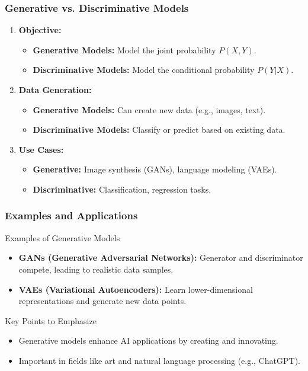 \documentclass[aspectratio=169]{beamer}
\begin{document}
\begin{frame}[fragile]
    \frametitle{Generative vs. Discriminative Models}
    \begin{enumerate}
        \item \textbf{Objective:}
        \begin{itemize}
            \item \textbf{Generative Models:} Model the joint probability \(P(X, Y)\).
            \item \textbf{Discriminative Models:} Model the conditional probability \(P(Y|X)\).
        \end{itemize}
        
        \item \textbf{Data Generation:}
        \begin{itemize}
            \item \textbf{Generative Models:} Can create new data (e.g., images, text).
            \item \textbf{Discriminative Models:} Classify or predict based on existing data.
        \end{itemize}
        
        \item \textbf{Use Cases:}
        \begin{itemize}
            \item \textbf{Generative:} Image synthesis (GANs), language modeling (VAEs).
            \item \textbf{Discriminative:} Classification, regression tasks.
        \end{itemize}
    \end{enumerate}
\end{frame}

\begin{frame}[fragile]
    \frametitle{Examples and Applications}
    \begin{block}{Examples of Generative Models}
        \begin{itemize}
            \item \textbf{GANs (Generative Adversarial Networks):} Generator and discriminator compete, leading to realistic data samples.
            \item \textbf{VAEs (Variational Autoencoders):} Learn lower-dimensional representations and generate new data points.
        \end{itemize}
    \end{block}
    
    \begin{block}{Key Points to Emphasize}
        \begin{itemize}
            \item Generative models enhance AI applications by creating and innovating.
            \item Important in fields like art and natural language processing (e.g., ChatGPT).
        \end{itemize}
    \end{block}
\end{frame}
\end{document}
